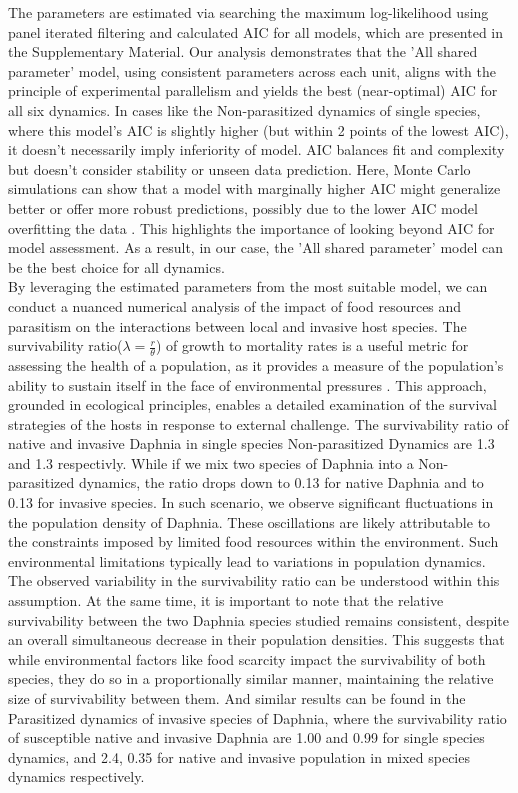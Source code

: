 \documentclass[12pt]{article}
\begin{document}
The parameters are estimated via searching the maximum log-likelihood using panel iterated filtering and calculated AIC for all models, which are presented in the Supplementary Material. Our analysis demonstrates that the 'All shared parameter' model, using consistent parameters across each unit, aligns with the principle of experimental parallelism and yields the best (near-optimal) AIC for all six dynamics. In cases like the Non-parasitized dynamics of single species, where this model's AIC is slightly higher (but within 2 points of the lowest AIC), it doesn't necessarily imply inferiority of model. AIC balances fit and complexity but doesn't consider stability or unseen data prediction. Here, Monte Carlo simulations can show that a model with marginally higher AIC might generalize better or offer more robust predictions, possibly due to the lower AIC model overfitting the data \cite{nylund2007deciding}. This highlights the importance of looking beyond AIC for model assessment. As a result, in our case, the 'All shared parameter' model can be the best choice for all dynamics.\\

By leveraging the estimated parameters from the most suitable model, we can conduct a nuanced numerical analysis of the impact of food resources and parasitism on the interactions between local and invasive host species. The survivability ratio($ \lambda = \frac{r}{\theta}$) of growth to mortality rates is a useful metric for assessing the health of a population, as it provides a measure of the population's ability to sustain itself in the face of environmental pressures \cite{ma2021unified}. This approach, grounded in ecological principles, enables a detailed examination of the survival strategies of the hosts in response to external challenge. The survivability ratio of native and invasive Daphnia in single species Non-parasitized Dynamics are 1.3 and 1.3 respectivly. While if we mix two species of Daphnia into a Non-parasitized dynamics, the ratio drops down to 0.13 for native Daphnia and to 0.13 for invasive species. In such scenario, we observe significant fluctuations in the population density of Daphnia. These oscillations are likely attributable to the constraints imposed by limited food resources within the environment. Such environmental limitations typically lead to variations in population dynamics. The observed variability in the survivability ratio can be understood within this assumption. At the same time, it is important to note that the relative survivability between the two Daphnia species studied remains consistent, despite an overall simultaneous decrease in their population densities. This suggests that while environmental factors like food scarcity impact the survivability of both species, they do so in a proportionally similar manner, maintaining the relative size of survivability between them. And similar results can be found in the Parasitized dynamics of invasive species of Daphnia, where the survivability ratio of susceptible native and invasive Daphnia are 1.00 and 0.99 for single species dynamics, and 2.4, 0.35 for native and invasive population in mixed species dynamics respectively.\\
\end{document}
